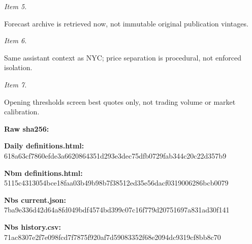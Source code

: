 \documentclass[11pt]{article}
\begin{document}
\par\noindent\textit{Item 5.}\par Forecast archive is retrieved now, not immutable original publication vintages.

\par\noindent\textit{Item 6.}\par Same assistant context as NYC; price separation is procedural, not enforced isolation.

\par\noindent\textit{Item 7.}\par Opening thresholds screen best quotes only, not trading volume or market calibration.

\par\noindent\textbf{Raw sha256:} \par \par\noindent\textbf{Daily definitions.html:} 618a63cf7860\hspace{0pt}efde3a662086\hspace{0pt}4351d293e3de\hspace{0pt}c75dfb0729fa\hspace{0pt}b344c20c22d3\hspace{0pt}57b9

\par\noindent\textbf{Nbm definitions.html:} 5115c4313054\hspace{0pt}bce18faa03b4\hspace{0pt}9b98b7f38512\hspace{0pt}ed35e56dacf0\hspace{0pt}319006286bcb\hspace{0pt}0079

\par\noindent\textbf{Nbs current.json:} 7ba9e336d42d\hspace{0pt}64a8fd049bdf\hspace{0pt}4574bd399c07\hspace{0pt}c16f779d2075\hspace{0pt}1697a831ad30\hspace{0pt}f141

\par\noindent\textbf{Nbs history.csv:} 71ac8307e2f7\hspace{0pt}e098fcd7f787\hspace{0pt}5f920af7d590\hspace{0pt}83352f68e209\hspace{0pt}4dc9319cf8bb\hspace{0pt}8c70
\end{document}
